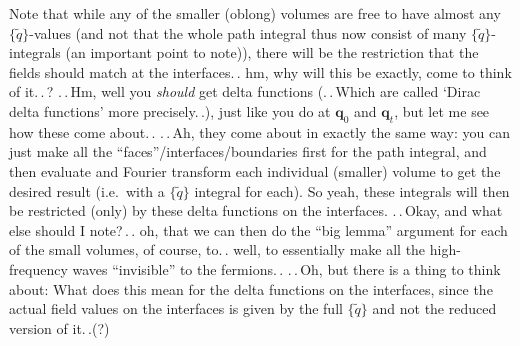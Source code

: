 \documentclass{report}
\begin{document}
Note that while any of the smaller (oblong) volumes are free to have almost any $\{\tilde q\}$-values (and not that the whole path integral thus now consist of many $\{\tilde q\}$-integrals (an important point to note)), there will be the restriction that the fields should match at the interfaces.\,. hm, why will this be exactly, come to think of it.\,.\,? .\,.\,Hm, well you \emph{should} get delta functions (.\,.\,Which are called `Dirac delta functions' more precisely.\,.), just like you do at $\boldsymbol{q}_0$ and $\boldsymbol{q}_t$, but let me see how these come about.\,. .\,.\,Ah, they come about in exactly the same way: you can just make all the ``faces''/interfaces/boundaries first for the path integral, and then evaluate and Fourier transform each individual (smaller) volume to get the desired result (i.e.\ with a $\{\tilde q\}$ integral for each). So yeah, these integrals will then be restricted (only) by these delta functions on the interfaces. .\,.\,Okay, and what else should I note?\,.\,. oh, that we can then do the ``big lemma'' argument for each of the small volumes, of course, to.\,. well, to essentially make all the high-frequency waves ``invisible'' to the fermions.\,. .\,.\,Oh, but there is a thing to think about: What does this mean for the delta functions on the interfaces, since the actual field values on the interfaces is given by the full $\{\tilde q\}$ and not the reduced version of it.\,.(?)  
\end{document}
